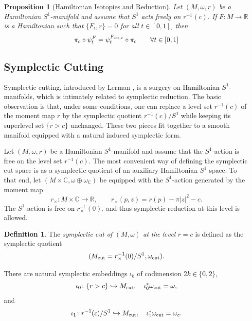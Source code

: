 \documentclass[10pt,oneside,reqno]{amsart}
\newtheorem{proposition}[theorem]{Proposition}
\theoremstyle{definition}
\newtheorem{definition}[theorem]{Definition}
\newcommand{\IR}{\mathbb{R}}
\newcommand{\resc}{{\textup{res},c}}
\newcommand{\cut}{\textup{cut}}
\begin{document}
\begin{proposition}[Hamiltonian Isotopies and Reduction] \label{prop:residualisotopy}
    Let $(M,\omega,r)$ be a Hamiltonian $S^1$-manifold and assume that $S^1$ acts freely on $r^{-1}(c)$. If $F:M\to \IR$ is a Hamiltonian such that $\{F_t,r\} = 0$ for all $t\in [0,1]$, then 
    \begin{equation*}
        \pi_c \circ \psi^F_t = \psi^{F_{\resc}}_t \circ \pi_c \qquad \forall t\in [0,1]
    \end{equation*}
\end{proposition}






\subsection{Symplectic Cutting}\label{ssec:cutting}
Symplectic cutting, introduced by Lerman \cite{lerman1995symplectic}, is a surgery on Hamiltonian $S^1$-manifolds, which is intimately related to symplectic reduction. The basic observation is that, under some conditions, one can replace a level set $r^{-1}(c)$ of the moment map $r$ by the symplectic quotient $r^{-1}(c)/S^1$ while keeping its superlevel set $\{r > c\}$ unchanged. These two pieces fit together to a smooth manifold equipped with a natural induced symplectic form. 

Let $(M,\omega,r)$ be a Hamiltonian $S^1$-manifold and assume that the $S^1$-action is free on the level set $r^{-1}(c)$. The most convenient way of defining the symplectic cut space is as a symplectic quotient of an auxiliary Hamiltonian $S^1$-space. To that end, let $(M\times\mathbb{C},\omega\oplus\omega_{\mathbb{C}})$ be equipped with the $S^1$-action generated by the moment map
\[
r_\times : M\times\mathbb{C} \to \mathbb{R}, \qquad
r_\times(p,z) = r(p) - \pi |z|^2 - c.
\]
The $S^1$-action is free on $r_\times^{-1}(0)$, and thus symplectic reduction at this level is allowed. 

\begin{definition}
    \label{def:sympcut}
    The \emph{symplectic cut of $(M,\omega)$ at the level $r = c$} is defined as the symplectic quotient 
    \begin{equation*}
        (M_\cut = r_\times^{-1}(0)/S^1,\omega_\cut).
    \end{equation*}
\end{definition}

There are natural symplectic embeddings $\iota_k$ of codimension $2k \in \{0,2\}$, 
\begin{equation*}
    \iota_0 \colon \{r > c\} \hookrightarrow M_\cut, \quad
    \iota_0^* \omega_\cut = \omega,
\end{equation*}
and 
\begin{equation*}
    \iota_1 \colon r^{-1}(c)/S^1 \hookrightarrow M_\cut, \quad
    \iota_1^* \omega_\cut = \omega_c. 
\end{equation*}
\end{document}
